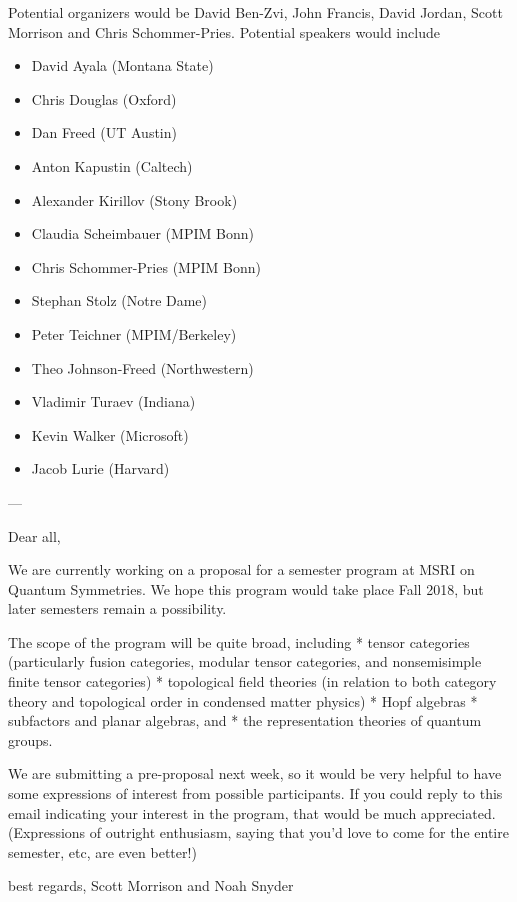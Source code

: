 \documentclass[11pt]{article}
\begin{document}
Potential organizers would be David Ben-Zvi, John Francis, David Jordan, Scott Morrison and Chris Schommer-Pries. %
Potential speakers would include 
\begin{itemize}
  \setlength{\itemsep}{1pt}
  \setlength{\parskip}{0pt}
  \setlength{\parsep}{0pt}
\item David Ayala	(Montana State)
\item Chris Douglas	(Oxford)
\item Dan Freed	(UT Austin)
\item Anton Kapustin	(Caltech)
\item Alexander Kirillov	(Stony Brook)
\item Claudia Scheimbauer	(MPIM Bonn)
\item Chris Schommer-Pries	(MPIM Bonn)
\item Stephan Stolz	(Notre Dame)
\item Peter Teichner	(MPIM/Berkeley)
\item Theo Johnson-Freed	(Northwestern)
\item Vladimir Turaev	(Indiana)
\item Kevin Walker (Microsoft)
\item Jacob Lurie (Harvard)
\end{itemize}


---

Dear all,

We are currently working on a proposal for a semester program at MSRI on Quantum Symmetries. We hope this program would take place Fall 2018, but later semesters remain a possibility.

The scope of the program will be quite broad, including
* tensor categories (particularly fusion categories,  modular tensor categories, and nonsemisimple finite tensor categories)
* topological field theories (in relation to both category theory and topological order in condensed matter physics)
* Hopf algebras
* subfactors and planar algebras, and 
* the representation theories of quantum groups.

We are submitting a pre-proposal next week, so it would be very helpful to have some expressions of interest from possible participants. If you could reply to this email indicating your interest in the program, that would be much appreciated. (Expressions of outright enthusiasm, saying that you'd love to come for the entire semester, etc, are even better!)

best regards,
Scott Morrison and Noah Snyder 
\end{document}
